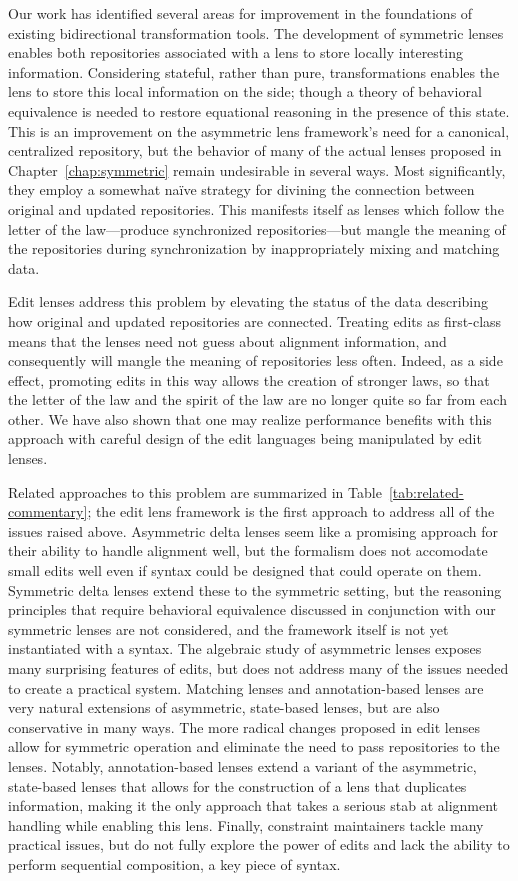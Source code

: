 Our work has identified several areas for improvement in the foundations of
existing bidirectional transformation tools. The development of symmetric
lenses enables both repositories associated with a lens to store locally
interesting information. Considering stateful, rather than pure,
transformations enables the lens to store this local information on the
side; though a theory of behavioral equivalence is needed to restore
equational reasoning in the presence of this state. This is an improvement
on the asymmetric lens framework's need for a canonical, centralized
repository, but the behavior of many of the actual lenses proposed in
Chapter~\ref{chap:symmetric} remain undesirable in several ways. Most
significantly, they employ a somewhat na\"ive strategy for divining the
connection between original and updated repositories. This manifests itself
as lenses which follow the letter of the law---produce synchronized
repositories---but mangle the meaning of the repositories during
synchronization by inappropriately mixing and matching data.

Edit lenses address this problem by elevating the status of the data
describing how original and updated repositories are connected. Treating
edits as first-class means that the lenses need not guess about alignment
information, and consequently will mangle the meaning of repositories less
often. Indeed, as a side effect, promoting edits in this way allows the
creation of stronger laws, so that the letter of the law and the spirit of
the law are no longer quite so far from each other. We have also shown that
one may realize performance benefits with this approach with careful design
of the edit languages being manipulated by edit lenses.

Related approaches to this problem are summarized in
Table~\ref{tab:related-commentary}; the edit lens framework is the first
approach to address all of the issues raised above. Asymmetric delta lenses
seem like a promising approach for their ability to handle alignment well,
but the formalism does not accomodate small edits well even if syntax could
be designed that could operate on them. Symmetric delta lenses extend these
to the symmetric setting, but the reasoning principles that require
behavioral equivalence discussed in conjunction with our symmetric lenses
are not considered, and the framework itself is not yet instantiated with a
syntax. The algebraic study of asymmetric lenses exposes many surprising
features of edits, but does not address many of the issues needed to create
a practical system. Matching lenses and annotation-based lenses are very
natural extensions of asymmetric, state-based lenses, but are also
conservative in many ways. The more radical changes proposed in edit lenses
allow for symmetric operation and eliminate the need to pass repositories to
the lenses. Notably, annotation-based lenses extend a variant of the
asymmetric, state-based lenses that allows for the construction of a lens
that duplicates information, making it the only approach that takes a
serious stab at alignment handling while enabling this lens. Finally,
constraint maintainers tackle many practical issues, but do not fully
explore the power of edits and lack the ability to perform sequential
composition, a key piece of syntax.

